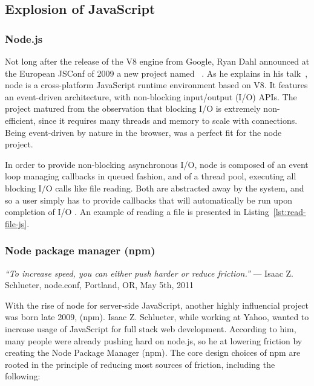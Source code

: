 \subsection{Explosion of JavaScript}%
\label{sub:explosion_of_javascript}


\subsubsection{Node.js}%
\label{ssub:node_js}

Not long after the release of the V8 engine from Google,
Ryan Dahl announced at the European JSConf of 2009
a new project named ~\cite{node-js-speaker}.
As he explains in his talk~\cite{node-js-video},
node is a cross-platform JavaScript runtime environment based on V8.
It features an event-driven architecture, with non-blocking input/output (I/O) APIs.
The project matured from the observation that blocking I/O is extremely non-efficient,
since it requires many threads and  memory to scale with connections.
 Being event-driven by nature in the browser,
 was a perfect fit for the node project.

In order to provide non-blocking asynchronous I/O,
node is composed of an event loop managing callbacks in queued fashion,
and of a thread pool, executing all blocking I/O calls like file reading.
Both are abstracted away by the system, and so a user simply has
to provide callbacks that will automatically be run upon completion of I/O .
An example of reading a file is presented in Listing~\ref{lst:read-file-js}.




\subsubsection{Node package manager (npm)}%
\label{ssub:node_package_manager_npm_}

\begin{displayquote}
	\textit{``To increase speed, you can either push harder or reduce friction.''}
	--- Isaac Z. Schlueter, node.conf, Portland, OR, May 5th, 2011
\end{displayquote}

With the rise of node for server-side JavaScript,
another highly influencial project was born late 2009,  (npm).
Isaac Z. Schlueter, while working at Yahoo, wanted to increase usage
of JavaScript for full stack web development.
According to him, many people were already pushing hard on node.js,
so he  at lowering friction by creating the Node Package Manager (npm).
The core design choices of npm are rooted in the principle of reducing
most sources of friction, including the following:

